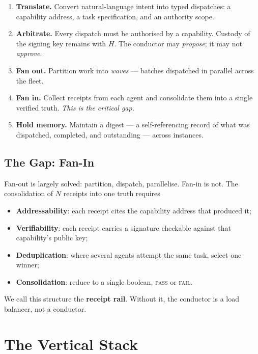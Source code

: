 \documentclass[11pt]{article}
\begin{document}
\begin{enumerate}[leftmargin=*]
  \item \textbf{Translate.} Convert natural-language intent into typed dispatches:
        a capability address, a task specification, and an authority scope.
  \item \textbf{Arbitrate.} Every dispatch must be authorised by a capability.
        Custody of the signing key remains with $H$. The conductor may
        \emph{propose}; it may not \emph{approve}.
  \item \textbf{Fan out.} Partition work into \emph{waves} --- batches dispatched
        in parallel across the fleet.
  \item \textbf{Fan in.} Collect receipts from each agent and consolidate them
        into a single verified truth. \emph{This is the critical gap.}
  \item \textbf{Hold memory.} Maintain a digest --- a self-referencing record of
        what was dispatched, completed, and outstanding --- across instances.
\end{enumerate}

\subsection{The Gap: Fan-In}

Fan-out is largely solved: partition, dispatch, parallelise. Fan-in is not. The
consolidation of $N$ receipts into one truth requires
\begin{itemize}[leftmargin=*]
  \item \textbf{Addressability}: each receipt cites the capability address that
        produced it;
  \item \textbf{Verifiability}: each receipt carries a signature checkable against
        that capability's public key;
  \item \textbf{Deduplication}: where several agents attempt the same task, select
        one winner;
  \item \textbf{Consolidation}: reduce to a single boolean, \textsc{pass} or
        \textsc{fail}.
\end{itemize}
We call this structure the \textbf{receipt rail}. Without it, the conductor is a
load balancer, not a conductor.

\section{The Vertical Stack}
\end{document}
